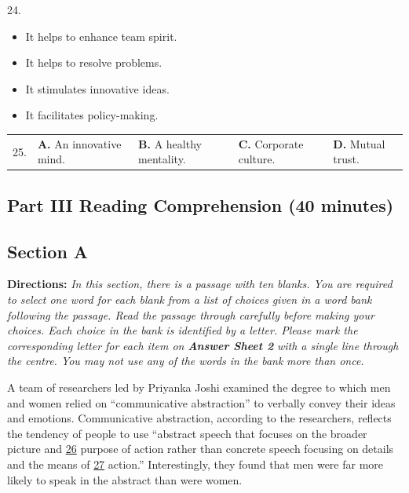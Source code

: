 \documentclass[UTF8,11pt]{ctexart}
\begin{document}
24.


\begin{itemize}[leftmargin=2em,itemsep=.2em,topsep=.4em]\item[A.] It helps to enhance team spirit.
\item[B.] It helps to resolve problems.
\item[C.] It stimulates innovative ideas.
\item[D.] It facilitates policy-making.
\end{itemize}

\noindent\begin{tabularx}{\linewidth}{@{}lXXXX@{}}25. & \textbf{A.} An innovative mind. & \textbf{B.} A healthy mentality. & \textbf{C.} Corporate culture. & \textbf{D.} Mutual trust.\\\end{tabularx}\par

\subsection*{\textbf{Part III Reading Comprehension (40 minutes)}}


\subsection*{\textbf{Section A}}


\textbf{Directions:} \textit{In this section, there is a passage with ten blanks. You are required to select one word for each blank} \textit{from a list of choices given in a word bank following the passage. Read the passage through carefully before} \textit{making your choices. Each choice in the bank is identified by a letter. Please mark the corresponding letter for} \textit{each item on }\textbf{\textit{Answer Sheet 2}}\textit{ with a single line through the centre. You may not use any of the words in the bank} \textit{more than once.}


A team of researchers led by Priyanka Joshi examined the degree to which men and women relied on “communicative abstraction” to verbally convey their ideas and emotions. Communicative abstraction, according to the researchers, reflects the tendency of people to use “abstract speech that focuses on the broader picture and \uline{26} purpose of action rather than concrete speech focusing on details and the means of \uline{27} action.” Interestingly, they found that men were far more likely to speak in the abstract than were women.
\end{document}
